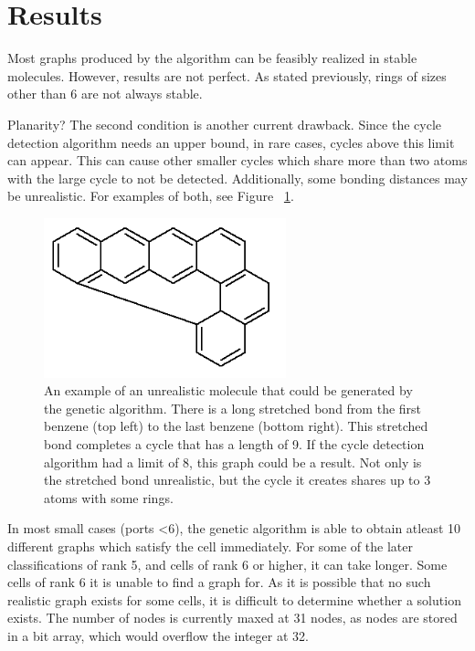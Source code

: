 \documentclass[12pt]{article}
\begin{document}
\section{Results}

Most graphs produced by the algorithm can be feasibly realized in stable molecules. However, results are not perfect. As stated previously, rings of sizes other than 6 are not always stable. 

Planarity? The second condition is another current drawback. Since the cycle detection algorithm needs an upper bound, in rare cases, cycles above this limit can appear. This can cause other smaller cycles which share more than two atoms with the large cycle to not be detected. Additionally, some bonding distances may be unrealistic. For examples of both, see Figure ~\ref{fig:unrealistic}.

\begin{figure}[ht!]
\centering
\includegraphics[width=70mm]{unrealistic.png}
\caption{An example of an unrealistic molecule that could be generated by the genetic algorithm. There is a long stretched bond from the first benzene (top left) to the last benzene (bottom right). This stretched bond completes a cycle that has a length of 9. If the cycle detection algorithm had a limit of 8, this graph could be a result. Not only is the stretched bond unrealistic, but the cycle it creates shares up to 3 atoms with some rings.}
\label{fig:unrealistic}
\end{figure}
 
In most small cases (ports \textless 6), the genetic algorithm is able to obtain atleast 10 different graphs which satisfy the cell immediately. For some of the later classifications of rank 5, and cells of rank 6 or higher, it can take longer. Some cells of rank 6 it is unable to find a graph for. As it is possible that no such realistic graph exists for some cells, it is difficult to determine whether a solution exists. The number of nodes is currently maxed at 31 nodes, as nodes are stored in a bit array, which would overflow the integer at 32.
\end{document}
